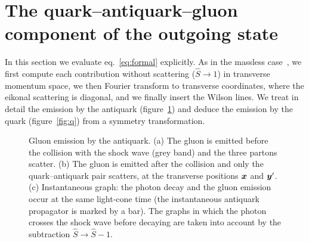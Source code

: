 \section{The quark--antiquark--gluon component of the outgoing state}
\label{sec:wf}

In this section we evaluate eq.~\eqref{eq:formal} explicitly. As in the massless
case~\cite{Iancu:2022gpw}, we first compute each contribution without scattering ($\hat S\to1$) in
transverse momentum space, we then Fourier transform to transverse coordinates, where the eikonal
scattering is diagonal, and we finally insert the Wilson lines. We treat in detail the emission by the
antiquark (figure~\ref{fig:qbar}) and deduce the emission by the quark (figure~\ref{fig:q}) from a
symmetry transformation.

\begin{figure}[t]
\centering
{}
\caption{Gluon emission by the antiquark. (a) The gluon is emitted before the collision with the
shock wave (grey band) and the three partons scatter. (b) The gluon is emitted after the collision and
only the quark--antiquark pair scatters, at the transverse positions $\bm{x}$ and $\bm{y}'$. (c) Instantaneous
graph: the photon decay and the gluon emission occur at the same light-cone time (the instantaneous
antiquark propagator is marked by a bar). The graphs in which the photon crosses the shock wave
before decaying are taken into account by the subtraction $\hat S\to\hat S-1$.}
\label{fig:qbar}
\end{figure}

